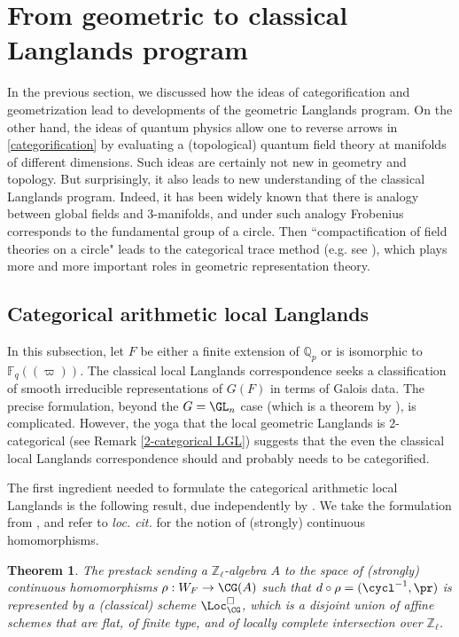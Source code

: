 \documentclass[11pt]{amsart}
\newtheorem{thm}{Theorem}[subsection]
\theoremstyle{definition}
\theoremstyle{definition}
\theoremstyle{definition}
\numberwithin{equation}{section}
\newcommand{\bF}{{\mathbb F}}
\newcommand{\bQ}{{\mathbb Q}}
\newcommand{\bZ}{{\mathbb Z}}
\begin{document}
\section{From geometric to classical Langlands program}
In the previous section, we discussed how the ideas of categorification and geometrization lead to developments of the geometric Langlands program. On the other hand,
the ideas of quantum physics allow one to reverse arrows in \eqref{categorification}
by evaluating a (topological) quantum field theory at manifolds of different dimensions. Such ideas are certainly not new in geometry and topology. But surprisingly, it also leads to new understanding of the classical Langlands program. Indeed, it has been widely known that there is analogy between global fields and $3$-manifolds, and under such analogy Frobenius corresponds to the fundamental group of a circle. Then ``compactification of field theories on a circle" leads to the categorical trace method (e.g. see \cite{AGKRRV, BCHN, Zhu-CDM}), which plays more and more important roles in geometric representation theory.

\subsection{Categorical arithmetic local Langlands}\label{S: Local Langlands}

In this subsection, let $F$ be either a finite extension of $\bQ_p$ or is isomorphic to $\bF_q((\varpi))$.  The classical local Langlands correspondence seeks a classification of smooth irreducible representations of $G(F)$ in terms of Galois data. The precise formulation, beyond the $G=\GL_n$ case (which is a theorem by \cite{LRS-GLn, Harris-Taylor-GLn}), is complicated.
However, the yoga that the local geometric Langlands is $2$-categorical (see Remark \ref{2-categorical LGL}) suggests that the even the classical local Langlands correspondence should and probably needs to be categorified.

The first ingredient needed to formulate the categorical arithmetic local Langlands is the following result, due independently by \cite{DHKM, Fargues-Scholze-Geometrization, Zhu-Conjecture}. We take the formulation from \cite{Zhu-Conjecture}, and refer to \emph{loc. cit.} for the notion of (strongly) continuous homomorphisms.

\begin{thm}\label{Stack of local parameters}
The prestack sending a $\bZ_\ell$-algebra $A$ to the space of (strongly) continuous homomorphisms $\rho: W_F\to \CG(A)$ such that $d\circ\rho=(\cycl^{-1},\pr)$ is represented by a (classical) scheme $\Loc_{\CG}^\Box$, which is a disjoint union of affine schemes that are flat, of finite type, and of locally complete intersection over $\bZ_\ell$. 
\end{thm}
\end{document}
